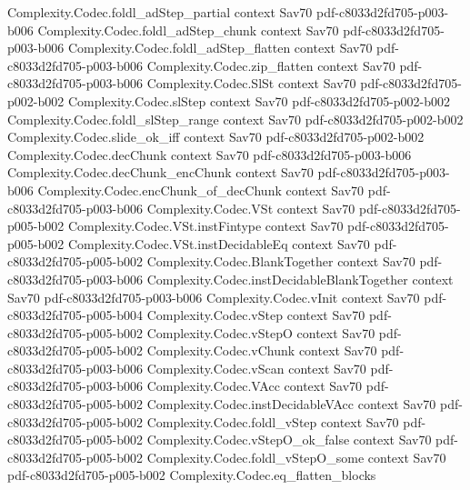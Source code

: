 \begin{theorem}
\proofstep
  {Complexity.Codec.foldl_adStep_partial}
  {context}
  {Sav70}
  {pdf-c8033d2fd705-p003-b006}
\proofstep
  {Complexity.Codec.foldl_adStep_chunk}
  {context}
  {Sav70}
  {pdf-c8033d2fd705-p003-b006}
\proofstep
  {Complexity.Codec.foldl_adStep_flatten}
  {context}
  {Sav70}
  {pdf-c8033d2fd705-p003-b006}
\proofstep
  {Complexity.Codec.zip_flatten}
  {context}
  {Sav70}
  {pdf-c8033d2fd705-p003-b006}
\proofstep
  {Complexity.Codec.SlSt}
  {context}
  {Sav70}
  {pdf-c8033d2fd705-p002-b002}
\proofstep
  {Complexity.Codec.slStep}
  {context}
  {Sav70}
  {pdf-c8033d2fd705-p002-b002}
\proofstep
  {Complexity.Codec.foldl_slStep_range}
  {context}
  {Sav70}
  {pdf-c8033d2fd705-p002-b002}
\proofstep
  {Complexity.Codec.slide_ok_iff}
  {context}
  {Sav70}
  {pdf-c8033d2fd705-p002-b002}
\proofstep
  {Complexity.Codec.decChunk}
  {context}
  {Sav70}
  {pdf-c8033d2fd705-p003-b006}
\proofstep
  {Complexity.Codec.decChunk_encChunk}
  {context}
  {Sav70}
  {pdf-c8033d2fd705-p003-b006}
\proofstep
  {Complexity.Codec.encChunk_of_decChunk}
  {context}
  {Sav70}
  {pdf-c8033d2fd705-p003-b006}
\proofstep
  {Complexity.Codec.VSt}
  {context}
  {Sav70}
  {pdf-c8033d2fd705-p005-b002}
\proofstep
  {Complexity.Codec.VSt.instFintype}
  {context}
  {Sav70}
  {pdf-c8033d2fd705-p005-b002}
\proofstep
  {Complexity.Codec.VSt.instDecidableEq}
  {context}
  {Sav70}
  {pdf-c8033d2fd705-p005-b002}
\proofstep
  {Complexity.Codec.BlankTogether}
  {context}
  {Sav70}
  {pdf-c8033d2fd705-p003-b006}
\proofstep
  {Complexity.Codec.instDecidableBlankTogether}
  {context}
  {Sav70}
  {pdf-c8033d2fd705-p003-b006}
\proofstep
  {Complexity.Codec.vInit}
  {context}
  {Sav70}
  {pdf-c8033d2fd705-p005-b004}
\proofstep
  {Complexity.Codec.vStep}
  {context}
  {Sav70}
  {pdf-c8033d2fd705-p005-b002}
\proofstep
  {Complexity.Codec.vStepO}
  {context}
  {Sav70}
  {pdf-c8033d2fd705-p005-b002}
\proofstep
  {Complexity.Codec.vChunk}
  {context}
  {Sav70}
  {pdf-c8033d2fd705-p003-b006}
\proofstep
  {Complexity.Codec.vScan}
  {context}
  {Sav70}
  {pdf-c8033d2fd705-p003-b006}
\proofstep
  {Complexity.Codec.VAcc}
  {context}
  {Sav70}
  {pdf-c8033d2fd705-p005-b002}
\proofstep
  {Complexity.Codec.instDecidableVAcc}
  {context}
  {Sav70}
  {pdf-c8033d2fd705-p005-b002}
\proofstep
  {Complexity.Codec.foldl_vStep}
  {context}
  {Sav70}
  {pdf-c8033d2fd705-p005-b002}
\proofstep
  {Complexity.Codec.vStepO_ok_false}
  {context}
  {Sav70}
  {pdf-c8033d2fd705-p005-b002}
\proofstep
  {Complexity.Codec.foldl_vStepO_some}
  {context}
  {Sav70}
  {pdf-c8033d2fd705-p005-b002}
\proofstep
  {Complexity.Codec.eq_flatten_blocks}

\end{theorem}
